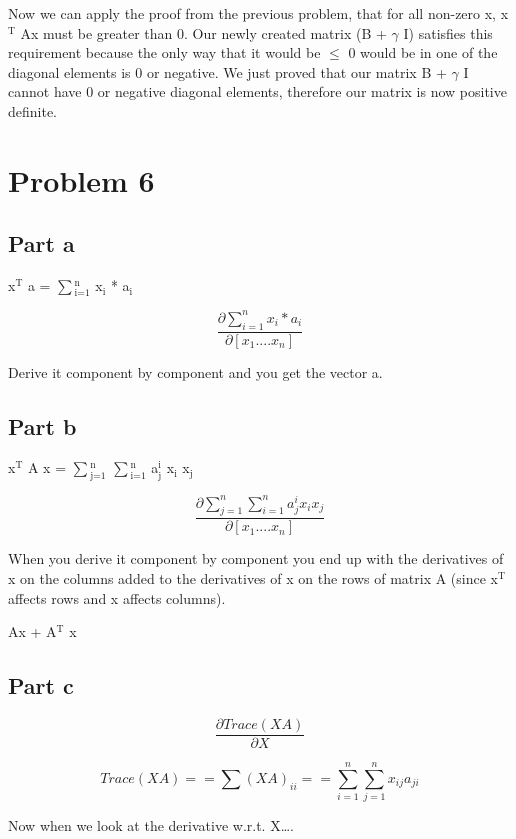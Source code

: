 \documentclass[11pt]{article}
\begin{document}
Now we can apply the proof from the previous problem, that for all non-zero x, x$^{\text{T}}$ Ax must be greater than 0. Our newly created matrix (B + $\gamma$ I) satisfies this requirement because the only way that it would be $\le$ 0 would be in one of the diagonal elements is 0 or negative. We just proved that our matrix B + $\gamma$ I cannot have 0 or negative diagonal elements, therefore our matrix is now positive definite.

\section{Problem 6}
\label{sec-6}
\subsection{Part a}
\label{sec-6-1}

x$^{\text{T}}$ a = $\sum$$_{\text{i=1}}^{\text{n}}$ x$_{\text{i}}$ * a$_{\text{i}}$

$$ \dfrac{ \partial \sum_{i=1}^{n} x_i * a_i }{ \partial [x_1 .... x_n] }$$

Derive it component by component and you get the vector a.

\subsection{Part b}
\label{sec-6-2}

x$^{\text{T}}$ A x = $\sum$$_{\text{j=1}}^{\text{n}}$ $\sum$$_{\text{i=1}}^{\text{n}}$ a$_{\text{j}}^{\text{i}}$ x$_{\text{i}}$ x$_{\text{j}}$

$$ \dfrac{ \partial \sum_{j=1}^{n} \sum_{i=1}^{n} a_j^i x_i x_j }{ \partial [x_1 .... x_n] }$$

When you derive it component by component you end up with the derivatives of x on the columns added to the derivatives of x on the rows of matrix A (since x$^{\text{T}}$ affects rows and x affects columns).

Ax + A$^{\text{T}}$ x

\subsection{Part c}
\label{sec-6-3}
$$ \dfrac{ \partial Trace(XA)}{ \partial X} $$

$$ Trace(XA) == \sum (XA)_{ii} == \sum_{i=1}^{n} \sum_{j=1}^{n} x_{ij} a_{ji} $$

Now when we look at the derivative w.r.t. X\ldots{}.
\end{document}
